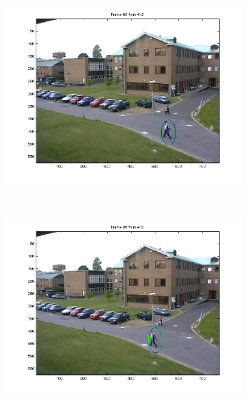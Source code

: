 \documentclass[hyperref={pdfpagelabels=false}]{beamer}
\begin{document}
\begin{frame}
\begin{figure}
\begin{subfigure}[b]{0.3\textwidth}
                 \includegraphics[width=\textwidth]{results/PETS01D1Human1man/Frame0060.png}
         \end{subfigure}
         \\
         \begin{subfigure}[b]{0.3\textwidth}
                 \includegraphics[width=\textwidth]{results/PETS01D1Human1man/Frame0086.png}
         \end{subfigure}
         \begin{subfigure}[b]{0.3\textwidth}

\end{subfigure}
\end{figure}
\end{frame}
\end{document}
